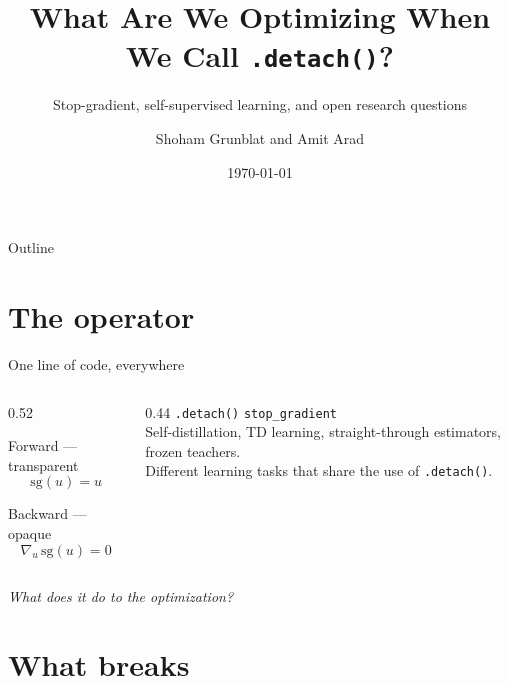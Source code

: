 \documentclass[aspectratio=169]{beamer}
\title[Detach(): Stop-Gradient as Dynamics]{What Are We Optimizing When We Call \texttt{.detach()}?}
\subtitle[Stop-gradient and SSL]{Stop-gradient, self-supervised learning, and open research questions}
\author[Grunblat \& Arad]{Shoham Grunblat and Amit Arad}
\institute[Group Meeting]{Advisor: Assaf Shocher}
\date{\today}
\begin{document}
\begin{frame}[plain]
  \maketitle
\end{frame}

\begin{frame}{Outline}
  \tableofcontents
\end{frame}

\section{The operator}

\begin{frame}{One line of code, everywhere}
  \begin{columns}[T,onlytextwidth]
    \begin{column}{0.52\textwidth}
      \begin{block}{Forward --- transparent}
        \[ \mathrm{sg}(u) = u \]
      \end{block}
      \begin{block}{Backward --- opaque}
        \[ \nabla_u\,\mathrm{sg}(u) = 0 \]
      \end{block}
    \end{column}
    \begin{column}{0.44\textwidth}
      \texttt{.detach()} \quad \texttt{stop\_gradient}\\[0.6em]
      Self-distillation, TD learning, straight-through estimators, frozen
      teachers.\\[0.6em]
      Different learning tasks that share the use of \texttt{.detach()}.
    \end{column}
  \end{columns}

  \vspace{1em}
  \begin{center}
    \emph{What does it do to the optimization?}
  \end{center}
\end{frame}

\section{What breaks}
\end{document}
